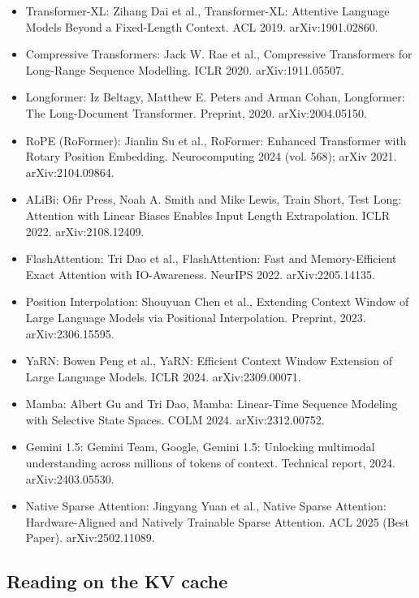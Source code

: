\begin{itemize}[leftmargin=*]
\item Transformer-XL: Zihang Dai et al., Transformer-XL: Attentive Language Models Beyond a Fixed-Length Context. ACL 2019. arXiv:1901.02860.
\item Compressive Transformers: Jack W. Rae et al., Compressive Transformers for Long-Range Sequence Modelling. ICLR 2020. arXiv:1911.05507.
\item Longformer: Iz Beltagy, Matthew E. Peters and Arman Cohan, Longformer: The Long-Document Transformer. Preprint, 2020. arXiv:2004.05150.
\item RoPE (RoFormer): Jianlin Su et al., RoFormer: Enhanced Transformer with Rotary Position Embedding. Neurocomputing 2024 (vol. 568); arXiv 2021. arXiv:2104.09864.
\item ALiBi: Ofir Press, Noah A. Smith and Mike Lewis, Train Short, Test Long: Attention with Linear Biases Enables Input Length Extrapolation. ICLR 2022. arXiv:2108.12409.
\item FlashAttention: Tri Dao et al., FlashAttention: Fast and Memory-Efficient Exact Attention with IO-Awareness. NeurIPS 2022. arXiv:2205.14135.
\item Position Interpolation: Shouyuan Chen et al., Extending Context Window of Large Language Models via Positional Interpolation. Preprint, 2023. arXiv:2306.15595.
\item YaRN: Bowen Peng et al., YaRN: Efficient Context Window Extension of Large Language Models. ICLR 2024. arXiv:2309.00071.
\item Mamba: Albert Gu and Tri Dao, Mamba: Linear-Time Sequence Modeling with Selective State Spaces. COLM 2024. arXiv:2312.00752.
\item Gemini 1.5: Gemini Team, Google, Gemini 1.5: Unlocking multimodal understanding across millions of tokens of context. Technical report, 2024. arXiv:2403.05530.
\item Native Sparse Attention: Jingyang Yuan et al., Native Sparse Attention: Hardware-Aligned and Natively Trainable Sparse Attention. ACL 2025 (Best Paper). arXiv:2502.11089.
\end{itemize}

\subsection{Reading on the KV cache}
\label{sec:it-R-kv}

